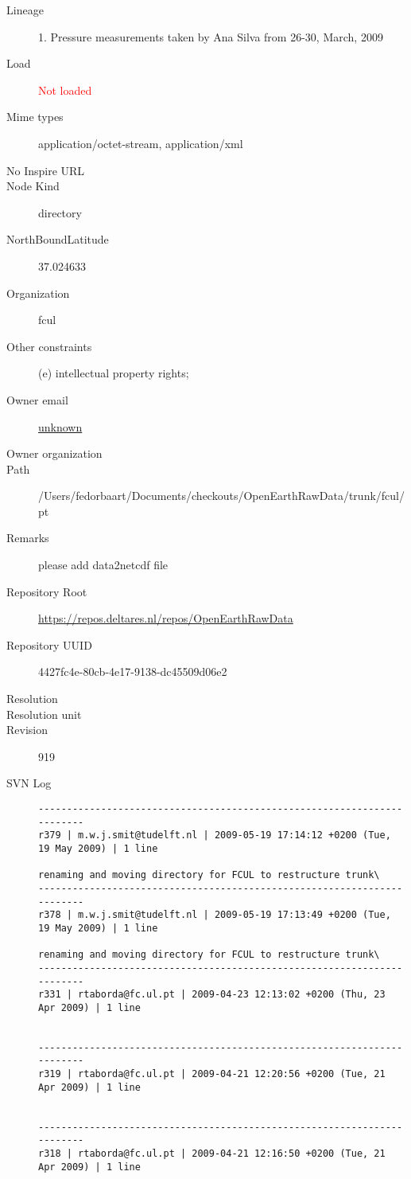 \documentclass[9]{report}
\begin{document}
\begin{description}
  \item[Lineage] 1. Pressure measurements taken by Ana Silva from 26-30, March, 2009
  \item[Load] \textcolor{red}{Not loaded}
  \item[Mime types] application/octet-stream, application/xml
  \item[No Inspire URL] 
  \item[Node Kind] directory
  \item[NorthBoundLatitude] 37.024633
  \item[Organization] fcul
  \item[Other constraints] (e) intellectual property rights;
  \item[Owner email] \href{mailto:unknown}{unknown}
  \item[Owner organization] 
  \item[Path] /Users/fedorbaart/Documents/checkouts/OpenEarthRawData/trunk/fcul/pt
  \item[Remarks] please add data2netcdf file
  \item[Repository Root] \href{https://repos.deltares.nl/repos/OpenEarthRawData}{https://repos.deltares.nl/repos/OpenEarthRawData}
  \item[Repository UUID] 4427fc4e-80cb-4e17-9138-dc45509d06e2
  \item[Resolution] 
  \item[Resolution unit] 
  \item[Revision] 919
  \item[SVN Log] \begin{verbatim}
------------------------------------------------------------------------
r379 | m.w.j.smit@tudelft.nl | 2009-05-19 17:14:12 +0200 (Tue, 19 May 2009) | 1 line

renaming and moving directory for FCUL to restructure trunk\
------------------------------------------------------------------------
r378 | m.w.j.smit@tudelft.nl | 2009-05-19 17:13:49 +0200 (Tue, 19 May 2009) | 1 line

renaming and moving directory for FCUL to restructure trunk\
------------------------------------------------------------------------
r331 | rtaborda@fc.ul.pt | 2009-04-23 12:13:02 +0200 (Thu, 23 Apr 2009) | 1 line


------------------------------------------------------------------------
r319 | rtaborda@fc.ul.pt | 2009-04-21 12:20:56 +0200 (Tue, 21 Apr 2009) | 1 line


------------------------------------------------------------------------
r318 | rtaborda@fc.ul.pt | 2009-04-21 12:16:50 +0200 (Tue, 21 Apr 2009) | 1 line



\end{verbatim}
\end{description}
\end{document}
